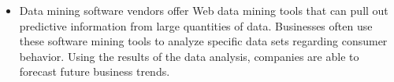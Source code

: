 \documentclass[12pt]{article}
\begin{document}
\begin{itemize}
\item	Data mining software vendors offer Web data mining tools that can pull out predictive information from large quantities of data. Businesses often use these software mining tools to analyze specific data sets regarding consumer behavior. Using the results of the data analysis, companies are able to forecast future business trends.
	
	\end{itemize}
\end{document}
